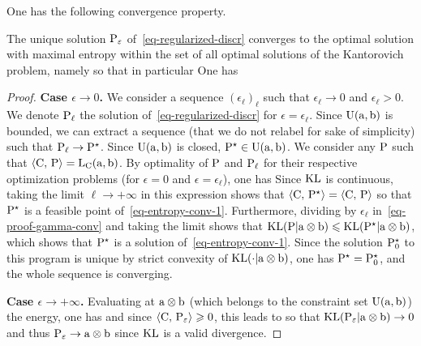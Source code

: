 One has the following convergence property.
 
\begin{prop}\label{prop-convergence-eps}
The unique solution $\P_\epsilon$ of~\eqref{eq-regularized-discr} converges to the optimal solution with maximal entropy within the set of all optimal solutions of the Kantorovich problem, namely
so that in particular
One has
\end{prop}

\begin{proof}
	\textbf{Case $\epsilon \rightarrow 0$.}
	 We consider a sequence $(\epsilon_\ell)_\ell$ such that $\epsilon_\ell \rightarrow 0$ and $\epsilon_\ell > 0$.	
 	We denote $\P_\ell$ the solution of~\eqref{eq-regularized-discr} for $\epsilon=\epsilon_\ell$. 
	Since $\CouplingsD(\a,\b)$ is bounded, we can extract a sequence (that we do not relabel for sake of simplicity) such that $\P_\ell \rightarrow \P^\star$. Since $\CouplingsD(\a,\b)$ is closed, $\P^\star \in \CouplingsD(\a,\b)$. We consider any $\P$ such that $\dotp{\C}{\P} = \MKD_\C(\a,\b)$. By optimality of $\P$ and $\P_\ell$ for their respective optimization problems (for $\epsilon=0$ and $\epsilon=\epsilon_\ell$), one has
 	Since $\KLD$ is continuous, taking the limit $\ell \rightarrow +\infty$ in this expression shows that 
 	$\dotp{\C}{\P^\star} = \dotp{\C}{\P}$ so that $\P^\star$ is a feasible point of~\eqref{eq-entropy-conv-1}. Furthermore, dividing by $\epsilon_\ell$ in~\eqref{eq-proof-gamma-conv} and taking the limit shows that 
 	$\KLD(\P|\a \otimes \b) \leq \KLD(\P^\star|\a \otimes \b)$, which shows that $\P^\star$ is a solution of~\eqref{eq-entropy-conv-1}. Since the solution $\P_0^\star$ to this program is unique by strict convexity of $\KLD(\cdot|\a \otimes \b)$, one has $\P^\star = \P_0^\star$, and the whole sequence is converging. 
	
	
	\textbf{Case $\epsilon \rightarrow +\infty$.} Evaluating at $\a \otimes \b$ (which belongs to the constraint set $\CouplingsD(\a,\b)$) the energy, one has
	and since $\dotp{\C}{\P_\epsilon} \geq 0$, this leads to
	so that $\KLD(\P_\epsilon|\a \otimes \b) \rightarrow 0$ and thus $\P_\epsilon \rightarrow \a \otimes \b$ since $\KLD$ is a valid divergence.
\end{proof}


